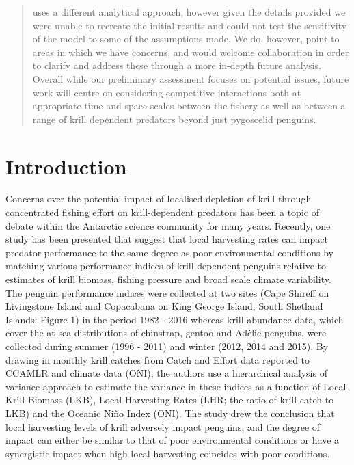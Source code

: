 \documentclass[]{elsarticle} %
\begin{document}
\begin{frontmatter}
\begin{abstract}
  \citet{Kruger2021} uses a different analytical approach, however given
  the details provided we were unable to recreate the initial results
  and could not test the sensitivity of the model to some of the
  assumptions made. We do, however, point to areas in which we have
  concerns, and would welcome collaboration in order to clarify and
  address these through a more in-depth future analysis. Overall while
  our preliminary assessment focuses on potential issues, future work
  will centre on considering competitive interactions both at
  appropriate time and space scales between the fishery as well as
  between a range of krill dependent predators beyond just pygoscelid
  penguins.
  \end{abstract}
  
 \end{frontmatter}

\section{Introduction}\label{introduction}

Concerns over the potential impact of localised depletion of krill
through concentrated fishing effort on krill-dependent predators has
been a topic of debate within the Antarctic science community for many
years. Recently, one study has been presented that suggest that local
harvesting rates can impact predator performance to the same degree as
poor environmental conditions \citep{Watters2020} by matching various
performance indices of krill-dependent penguins relative to estimates of
krill biomass, fishing pressure and broad scale climate variability. The
penguin performance indices were collected at two sites (Cape Shireff on
Livingstone Island and Copacabana on King George Island, South Shetland
Islands; Figure 1) in the period 1982 - 2016 whereas krill abundance
data, which cover the at-sea distributions of chinstrap, gentoo and
Adélie penguins, were collected during summer (1996 - 2011) and winter
(2012, 2014 and 2015). By drawing in monthly krill catches from Catch
and Effort data reported to CCAMLR and climate data (ONI), the authors
use a hierarchical analysis of variance approach to estimate the
variance in these indices as a function of Local Krill Biomass (LKB),
Local Harvesting Rates (LHR; the ratio of krill catch to LKB) and the
Oceanic Niño Index (ONI). The study drew the conclusion that local
harvesting levels of krill adversely impact penguins, and the degree of
impact can either be similar to that of poor environmental conditions or
have a synergistic impact when high local harvesting coincides with poor
conditions.
\end{document}
